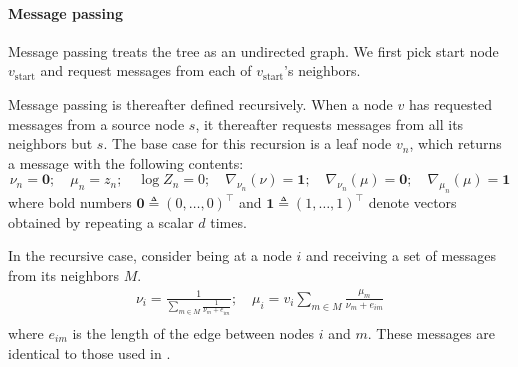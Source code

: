 \paragraph{Message passing} Message
passing treats the tree as an undirected graph. 
We first pick start node $v_{\text{start}}$
and request messages from each of $v_{\text{start}}$'s neighbors.

Message passing is thereafter defined recursively. 
When a node $v$ has requested messages from a source node $s$,
it thereafter requests messages from all its neighbors but $s$.
The base case for this recursion is a leaf node $v_n$,
which returns a message with the following contents:
\begin{equation}
    \nu_n = \bm{0};\quad \mu_n = z_n;\quad \log Z_n = 0;\quad \nabla_{\nu_n}(\nu) = \bm{1};\quad \nabla_{\nu_n}(\mu) = \bm{0};\quad \nabla_{\mu_n}(\mu) = \bm{1}
\end{equation}
where bold numbers $\bm{0}\triangleq (0,\ldots,0)^\top$ and $\bm{1}\triangleq (1,\ldots,1)^\top$ denote vectors obtained by repeating a scalar $d$ times.

In the recursive case, consider being at a node $i$ and receiving a set of messages from its neighbors $M$.
\begin{equation}
\begin{split}
    \nu_i = \frac{1}{\sum_{m \in M}\frac{1}{\nu_m + e_{im}}} ;\quad \mu_i = v_i \sum_{m \in M} \frac{\mu_m}{\nu_m + e_{im}}\\
\end{split}
\end{equation}
where $e_{im}$ is the length of the edge between nodes $i$ and $m$.
These messages are identical to those used in \cite{boyles2012time}.

